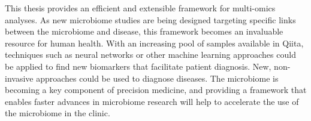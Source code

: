 This thesis provides an efficient and extensible framework for multi-omics analyses.
As new microbiome studies are being designed targeting specific links between the
microbiome and disease, this framework becomes an invaluable resource for human
health. With an increasing pool of samples available in Qiita, techniques such as
neural networks or other machine learning approaches could be applied to find new
biomarkers that facilitate patient diagnosis. New, non-invasive approaches could
be used to diagnose diseases. The microbiome is becoming a key component of precision
medicine, and providing a framework that enables faster advances in microbiome
research will help to accelerate the use of the microbiome in the clinic.
